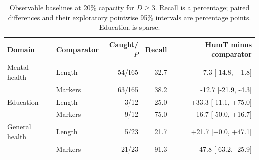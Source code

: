 \begin{table}[htbp]
\centering\small
\caption{Observable baselines at 20\% capacity for $\overline D\geq3$. Recall is a percentage; paired differences and their exploratory pointwise 95\% intervals are percentage points. Education is sparse.}
\label{tab:baselines}
\begin{tabular}{llrrr}
\toprule
Domain & Comparator & Caught/$P$ & Recall & HumT minus comparator \\
\midrule
Mental health & Length & 54/165 & 32.7 & -7.3 [-14.8, +1.8] \\
 & Markers & 63/165 & 38.2 & -12.7 [-21.9, -4.3] \\
Education & Length & 3/12 & 25.0 & +33.3 [-11.1, +75.0] \\
 & Markers & 9/12 & 75.0 & -16.7 [-50.0, +16.7] \\
General health & Length & 5/23 & 21.7 & +21.7 [+0.0, +47.1] \\
 & Markers & 21/23 & 91.3 & -47.8 [-63.2, -25.9] \\
\bottomrule
\end{tabular}
\end{table}
